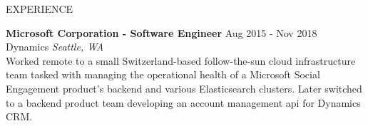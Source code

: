 \begin{rSection}{EXPERIENCE}
\begin{itemize}
 \end{itemize}
\vspace{1em}
\textbf{Microsoft Corporation - Software Engineer} \hfill Aug 2015 - Nov 2018\\
Dynamics  \hfill \textit{Seattle, WA} \vspace{1em} \\
Worked remote to a small Switzerland-based follow-the-sun cloud infrastructure team tasked with managing the operational health of a Microsoft Social Engagement product's backend and various Elasticsearch clusters. Later switched to a backend product team developing an account management api for Dynamics CRM.\vspace{0.5em}
\end{rSection} 